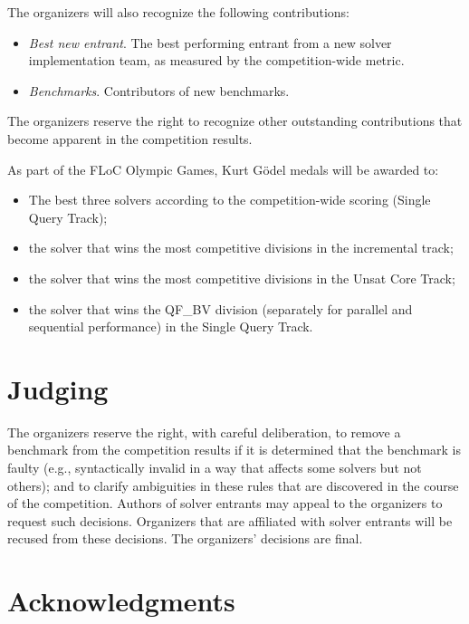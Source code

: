 \documentclass[12pt]{article}
\newcommand{\main}{Single Query\xspace}
\newcommand{\ucore}{Unsat Core\xspace}
\begin{document}
The organizers will also recognize the following contributions:
%
\begin{itemize}
\item \emph{Best new entrant}. The best performing entrant from a new
  solver implementation team, as measured by the competition-wide
  metric.
\item \emph{Benchmarks}. Contributors of new benchmarks.
\end{itemize}
%
The organizers reserve the right to recognize other outstanding
contributions that become apparent in the competition results.

As part of the FLoC Olympic Games, Kurt G{\"o}del medals will be
awarded to:
%
\begin{itemize}
\item The best three solvers according to the competition-wide scoring
  (\main Track);
\item the solver that wins the most competitive divisions in the
  incremental track;
\item the solver that wins the most competitive divisions in the
  \ucore Track;
\item the solver that wins the QF\_BV division (separately for
  parallel and sequential performance) in the \main Track.
\end{itemize}


\section{Judging}

The organizers reserve the right, with careful deliberation, to remove
a benchmark from the competition results if it is determined that the
benchmark is faulty (e.g., syntactically invalid in a way that affects
some solvers but not others); and to clarify ambiguities in these
rules that are discovered in the course of the competition.  Authors
of solver entrants may appeal to the organizers to request such
decisions.  Organizers that are affiliated with solver entrants will
be recused from these decisions.  The organizers' decisions are final.


\section{Acknowledgments}
\end{document}
